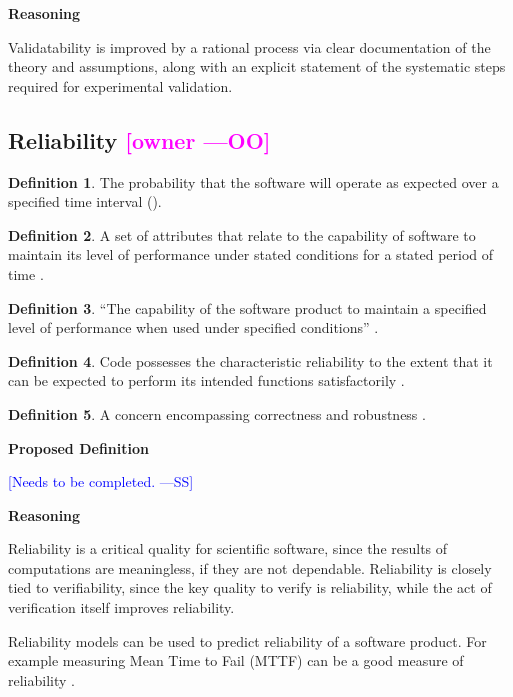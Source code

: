 \documentclass[letterpaper,cleveref]{lipics-v2019}
\newcommand{\authornote}[3]{\textcolor{#1}{[#3 ---#2]}}
\newcommand{\authornote}[3]{}
\newcommand{\wss}[1]{\authornote{blue}{SS}{#1}} %
\newcommand{\oo}[1]{\authornote{magenta}{OO}{#1}} %
\theoremstyle{definition}
\newtheorem{defn}{Definition}
\begin{document}
\noindent \textbf{Reasoning}

Validatability is improved by a rational process via clear documentation of the
theory and assumptions, along with an explicit statement of the systematic steps
required for experimental validation.

\subsection{Reliability \oo{owner}}

\begin{defn}
  The probability that the software will operate as expected over a specified
  time interval (\citep{GhezziEtAl2003}).
\end{defn}

\begin{defn}
  A set of attributes that relate to the capability of software to maintain its
  level of performance under stated conditions for a stated period of time
  \citep{berander2005software}.
\end{defn}

\begin{defn}
  ``The capability of the software product to maintain a specified level of
  performance when used under specified conditions''
  \citep{international2001iso}.
\end{defn}

\begin{defn}
  Code possesses the characteristic reliability to the extent that it can be
  expected to perform its intended functions satisfactorily
  \citep{boehm2007software}.
\end{defn}

\begin{defn}
  A concern encompassing correctness and robustness \citep{meyer1988object}.
\end{defn}

\noindent \textbf{Proposed Definition}

\wss{Needs to be completed.}

\noindent \textbf{Reasoning}

Reliability is a critical quality for scientific software, since the results of
computations are meaningless, if they are not dependable.  Reliability is
closely tied to verifiability, since the key quality to verify is reliability,
while the act of verification itself improves reliability.

Reliability models can be used to predict reliability of a software product. For
example measuring Mean Time to Fail (MTTF) can be a good measure of reliability
\citep{berander2005software}.
\end{document}
